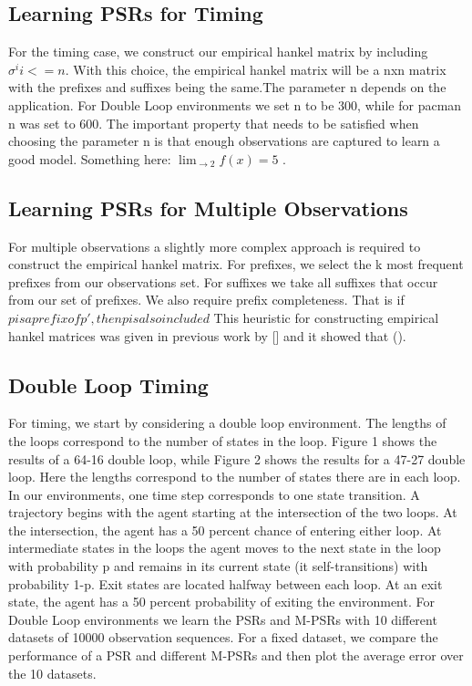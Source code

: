 \subsection{Learning PSRs for Timing}
For the timing case, we construct our empirical hankel matrix by including ${\sigma^i i<=n}$. With this choice, the empirical hankel matrix will be a nxn matrix with the prefixes and suffixes being the same.The parameter n depends on the application. For Double Loop environments we set n to be 300, while for pacman n was set to 600. The important property that needs to be satisfied when choosing the parameter n is that enough observations are captured to learn a good model. Something here: $\lim_{ \to 2} f(x) = 5$ .

\subsection{Learning PSRs for Multiple Observations}

For multiple observations a slightly more complex approach is required to construct the empirical hankel matrix. For prefixes, we select the k most frequent prefixes from our observations set. For suffixes we take all suffixes that occur from our set of prefixes. We also require prefix completeness. That is if $p is a prefix of p', then p is also included$ This heuristic for constructing empirical hankel matrices was given in previous work by [] and it showed that ().

\subsection{Double Loop Timing}

For timing, we start by considering a double loop environment. The lengths of the loops correspond to the number of states in the loop. Figure 1 shows the results of a 64-16 double loop, while Figure 2 shows the results for a 47-27 double loop. Here the lengths correspond to the number of states there are in each loop. In our environments, one time step corresponds to one state transition. A trajectory begins with the agent starting at the intersection of the two loops. At the intersection, the agent has a 50 percent chance of entering either loop. At intermediate states in the loops the agent moves to the next state in the loop with probability p and remains in its current state (it self-transitions) with probability 1-p. Exit states are located halfway between each loop. At an exit state, the agent has a 50 percent probability of exiting the environment. For Double Loop environments we learn the PSRs and M-PSRs with 10 different datasets of 10000 observation sequences. For a fixed dataset, we compare the performance of a PSR and different M-PSRs and then plot the average error over the 10 datasets.


